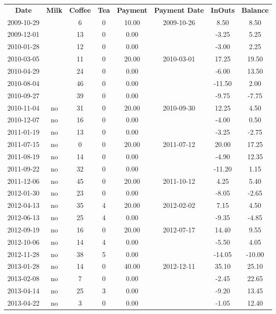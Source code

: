 \begin{center}
\begin{tabular}{cccccccc}
\textbf{Date} & \textbf{Milk} & \textbf{Coffee} & \textbf{Tea} & \textbf{Payment} & \textbf{Payment Date} & \textbf{InOuts} & \textbf{Balance} \\
2009-10-29 &  &  6 & 0 & 10.00 & 2009-10-26 &   8.50 &   8.50\\ 
2009-12-01 &  & 13 & 0 &  0.00 &  &  -3.25 &   5.25\\ 
2010-01-28 &  & 12 & 0 &  0.00 &  &  -3.00 &   2.25\\ 
2010-03-05 &  & 11 & 0 & 20.00 & 2010-03-01 &  17.25 &  19.50\\ 
2010-04-29 &  & 24 & 0 &  0.00 &  &  -6.00 &  13.50\\ 
2010-08-04 &  & 46 & 0 &  0.00 &  & -11.50 &   2.00\\ 
2010-09-27 &  & 39 & 0 &  0.00 &  &  -9.75 &  -7.75\\ 
2010-11-04 & no & 31 & 0 & 20.00 & 2010-09-30 &  12.25 &   4.50\\ 
2010-12-07 & no & 16 & 0 &  0.00 &  &  -4.00 &   0.50\\ 
2011-01-19 & no & 13 & 0 &  0.00 &  &  -3.25 &  -2.75\\ 
2011-07-15 & no &  0 & 0 & 20.00 & 2011-07-12 &  20.00 &  17.25\\ 
2011-08-19 & no & 14 & 0 &  0.00 &  &  -4.90 &  12.35\\ 
2011-09-22 & no & 32 & 0 &  0.00 &  & -11.20 &   1.15\\ 
2011-12-06 & no & 45 & 0 & 20.00 & 2011-10-12 &   4.25 &   5.40\\ 
2012-01-30 & no & 23 & 0 &  0.00 &  &  -8.05 &  -2.65\\ 
2012-04-13 & no & 35 & 4 & 20.00 & 2012-02-02 &   7.15 &   4.50\\ 
2012-06-13 & no & 25 & 4 &  0.00 &  &  -9.35 &  -4.85\\ 
2012-09-19 & no & 16 & 0 & 20.00 & 2012-07-17 &  14.40 &   9.55\\ 
2012-10-06 & no & 14 & 4 &  0.00 &  &  -5.50 &   4.05\\ 
2012-11-28 & no & 38 & 5 &  0.00 &  & -14.05 & -10.00\\ 
2013-01-28 & no & 14 & 0 & 40.00 & 2012-12-11 &  35.10 &  25.10\\ 
2013-02-08 & no &  7 & 0 &  0.00 &  &  -2.45 &  22.65\\ 
2013-04-14 & no & 25 & 3 &  0.00 &  &  -9.20 &  13.45\\ 
2013-04-22 & no &  3 & 0 &  0.00 &  &  -1.05 &  12.40
\end{tabular}
\end{center}

